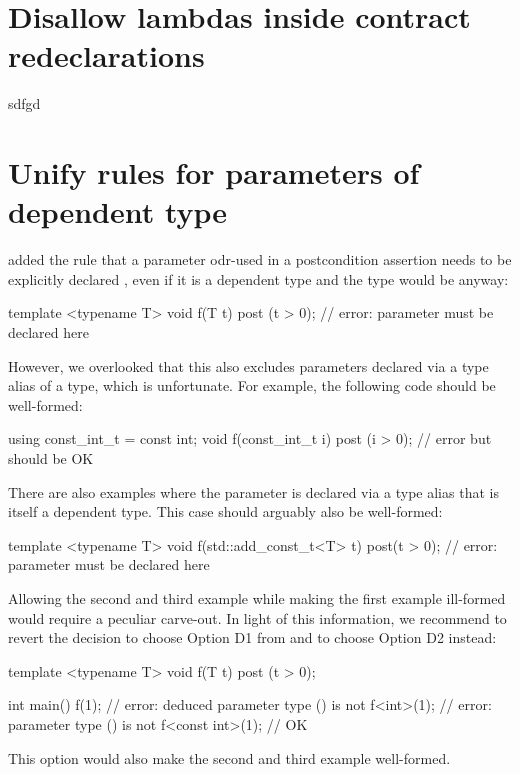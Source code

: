 \pagebreak

\section{Disallow lambdas inside contract redeclarations}

sdfgd

\section{Unify rules for parameters of dependent type}

\cite{P3489R0} added the rule that a parameter odr-used in a postcondition assertion needs to be explicitly declared , even if it is a dependent type and the type would be  anyway:

\begin{codeblock}
template <typename T>
void f(T t) post (t > 0);  // error: parameter must be declared  here
\end{codeblock}

However, we overlooked that this also excludes parameters declared via a type alias of a  type, which is unfortunate. For example, the following code should be well-formed:

\begin{codeblock}
using const_int_t = const int;
void f(const_int_t i) post (i > 0);  // error but should be OK
\end{codeblock}

There are also examples where the parameter is declared via a type alias that is itself a dependent type. This case should arguably also be well-formed:

\begin{codeblock}
template <typename T>
void f(std::add_const_t<T> t) post(t > 0);  // error: parameter must be declared  here
\end{codeblock}

Allowing the second and third example while making the first example ill-formed would require a peculiar carve-out. In light of this information, we recommend to revert the decision to choose Option D1 from \cite{P3489R0} and to choose Option D2 instead:
\begin{codeblock}
template <typename T>
void f(T t) post (t > 0);  

int main() {
  f(1);              // error: deduced parameter type () is not 
  f<int>(1);         // error: parameter type () is not 
  f<const int>(1);   // OK
}
\end{codeblock}
This option would also make the second and third example well-formed.

